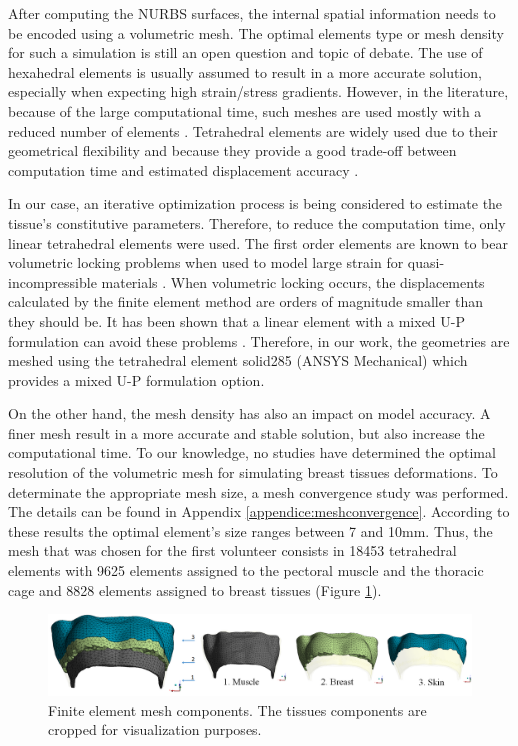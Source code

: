 After computing the NURBS surfaces, the internal spatial information needs to be encoded using a volumetric mesh. The optimal elements type or mesh density for such a simulation is still an open question and topic of debate. The use of hexahedral elements is usually assumed to result in a more accurate solution, especially when expecting high strain/stress gradients. However, in the literature, because of the large computational time, such meshes are used mostly with a reduced number of elements \citep{ruiter_model_based_2006,gamage_modelling_2012}. Tetrahedral elements are widely used due to their geometrical flexibility and because they provide a good trade-off between computation time and estimated displacement accuracy \citep{han_nonlinear_2014,palomar_finite_2008,griesenauer_breast_2017}.   

In our case, an iterative optimization process is being considered to estimate the tissue's constitutive parameters. Therefore, to reduce the computation time, only linear tetrahedral elements were used. The first order elements are known to bear volumetric locking problems when used to model large strain for quasi-incompressible materials \citep{fung_classical_2017}. When volumetric locking occurs, the displacements calculated by the finite element method are orders of magnitude smaller than they should be. It has been shown that a linear element with a mixed U-P formulation can avoid these problems \citep{rohan_finite_2014}. Therefore, in our work, the geometries are meshed using the tetrahedral element solid285 (ANSYS Mechanical) which provides a mixed U-P formulation option. 

 On the other hand, the mesh density has also an impact on model accuracy. A finer mesh result in a more accurate and stable solution, but also increase the computational time. To our knowledge, no studies have determined the optimal resolution of the volumetric mesh for simulating breast tissues deformations. To determinate the appropriate mesh size, a mesh convergence study was performed. The details can be found in Appendix \ref{appendice:meshconvergence}.  According to these results the optimal element’s size ranges between 7 and 10mm. Thus, the mesh that was chosen for the first volunteer consists in 18453 tetrahedral elements with 9625 elements assigned to the pectoral muscle and the thoracic cage and 8828 elements assigned to breast tissues (Figure \ref{fig:meshcomponents}).
 
 \begin{figure}[!h]
\centering
\includegraphics[width=1\textwidth,keepaspectratio]{figures/mesh3components.png} 
\caption{ Finite element mesh components. The tissues components are cropped for visualization purposes. }\label{fig:meshcomponents}
\end{figure}
 
